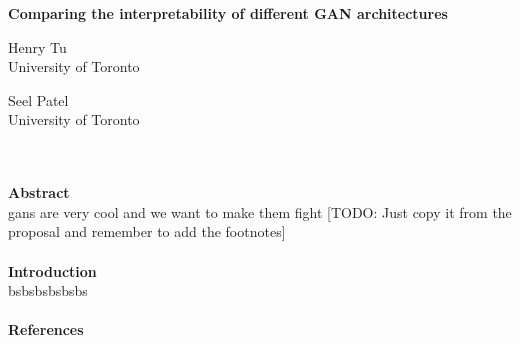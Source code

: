 \documentclass[12pt]{article}
\begin{document}
\begin{center}
    \textbf{Comparing the interpretability of different GAN architectures}
\end{center}
\begin{minipage}{.5\textwidth}
            \centering
            Henry Tu\\
            University of Toronto
\end{minipage}
\begin{minipage}{.5\textwidth}
            \centering
            Seel Patel\\
            University of Toronto
\end{minipage}
\\\\
\textbf{Abstract}\\
gans are very cool and we want to make them fight [TODO: Just copy it from the proposal and remember to add the footnotes]
\\\\
\textbf{Introduction}\\
bsbsbsbsbsbs
\\\\
\textbf{References}\\
\end{document}
